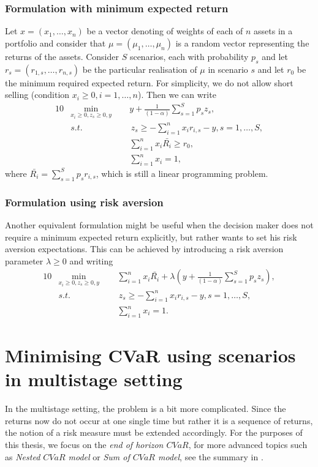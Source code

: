 \subsubsection*{Formulation with minimum expected return}
Let $x=(x_1,\dots,x_n)$ be a vector denoting of weights of each of $n$ assets in a portfolio and consider that $\mu=(\mu_1,\dots,\mu_n)$ is a random vector representing the returns of the assets. Consider $S$ scenarios, each with probability $p_s$ and let $r_s = (r_{1,s},\dots,r_{n,s})$ be the particular realisation of $\mu$ in scenario $s$ and let $r_0$ be the minimum required expected return. For simplicity, we do not allow short selling (condition $x_i \geq 0, i=1,\dots,n$). Then we can write
\begin{alignat}{10}
& \underset{x_i \geq 0 , z_s \geq 0, y}{\min}  \, \, \, && y + \frac{1}{(1-\alpha)} \sum_{s=1}^S p_s z_s, \label{cvar_expected_return}  \\
&s.t. && \, z_s \geq  -\sum_{i=1}^{n} x_i r_{i,s} -y, s=1,\dots,S, \nonumber \\
&  && \sum_{i=1}^{n} x_i \bar{R_i} \geq r_0, \nonumber \\
&  && \sum_{i=1}^{n} x_i = 1, \nonumber
\end{alignat}
where $\bar{R_i}=\sum_{s=1}^{S}p_s r_{i,s}$, which is still a linear programming problem.
\subsubsection*{Formulation using risk aversion}
Another equivalent formulation might be useful when the decision maker does not require a minimum expected return explicitly, but rather wants to set his risk aversion expectations. This can be achieved by introducing a risk aversion parameter $\lambda \geq 0$ and writing
\begin{alignat}{10}
& \underset{x_i \geq 0 , z_s \geq 0, y}{\min}  \, \, \, && \sum_{i=1}^{n} x_i \bar{R_i} + \lambda \left( y + \frac{1}{(1-\alpha)} \sum_{s=1}^S p_s z_s \right), \label{eq:cvar_risk_aversion} \\
&s.t. && \, z_s \geq  -\sum_{i=1}^{n} x_i r_{i,s} -y, s=1,\dots,S, \nonumber \\
&  && \sum_{i=1}^{n} x_i = 1. \nonumber
\end{alignat}
\section{Minimising CVaR using scenarios in multistage setting}
In the multistage setting, the problem is a bit more complicated. Since the returns now do not occur at one single time but rather it is a sequence of returns, the notion of a risk measure must be extended accordingly. For the purposes of this thesis, we focus on the \textit{end of horizon $CVaR$}, for more advanced topics such as \textit{Nested $CVaR$ model} or \textit{Sum of $CVaR$ model}, see the summary in \cite[Section 1.4.]{kozmikv_phdthesis}.

